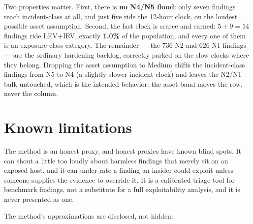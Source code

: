 \documentclass[11pt]{article}
\begin{document}
Two properties matter. First, there is \textbf{no N4/N5 flood}: only seven findings
reach incident-class at all, and just five ride the 12-hour clock, on the loudest
possible asset assumption. Second, the fast clock is scarce and earned:
$5 + 9 = 14$ findings ride LEV+IRV, exactly \textbf{1.0\%} of the population, and every
one of them is an exposure-class category. The remainder --- the 736 N2 and 626 N1
findings --- are the ordinary hardening backlog, correctly parked on the slow clocks
where they belong. Dropping the asset assumption to Medium shifts the incident-class
findings from N5 to N4 (a slightly slower incident clock) and leaves the N2/N1 bulk
untouched, which is the intended behavior: the asset band moves the row, never the
column.

\section{Known limitations}
\label{sec:limits}
\begin{plain}
The method is an honest proxy, and honest proxies have known blind spots. It can
shout a little too loudly about harmless findings that merely sit on an exposed host,
and it can under-rate a finding an insider could exploit unless someone supplies the
evidence to override it. It is a calibrated triage tool for benchmark findings, not a
substitute for a full exploitability analysis, and it is never presented as one.
\end{plain}

The method's approximations are disclosed, not hidden:
\end{document}
